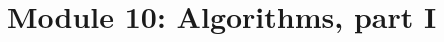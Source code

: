 \section{Module 10: Algorithms, part I}


\begin{comment}

%

%

%

%

\section{Term Paper}


\end{comment}



